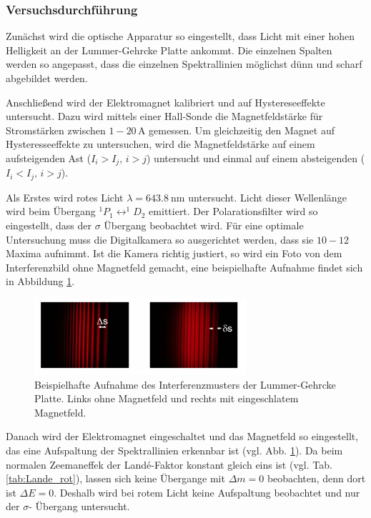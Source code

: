 \subsubsection{Versuchsdurchführung}
Zunächst wird die optische Apparatur so eingestellt, dass Licht mit einer hohen Helligkeit %
an der Lummer-Gehrcke Platte ankommt. Die einzelnen Spalten werden so angepasst, dass die %
einzelnen Spektrallinien möglichst dünn und scharf abgebildet werden.

Anschließend wird der Elektromagnet kalibriert und auf Hystereseeffekte untersucht.
Dazu wird mittels einer Hall-Sonde die Magnetfeldstärke für Stromstärken
zwischen $\num{1}-\num{20}\,\si{\ampere}$ gemessen. Um gleichzeitig den Magnet auf Hysteresseeffekte zu untersuchen,
wird die Magnetfeldstärke auf einem aufsteigenden Ast ($I_i>I_j,\, i>j$) untersucht und einmal auf einem absteigenden ($I_i<I_j,\, i>j$).

Als Erstes wird rotes Licht $\lambda = \SI{643.8}{\nano\meter}$ untersucht.
Licht dieser Wellenlänge wird beim Übergang $^1P_1\leftrightarrow ^1\!\!D_2$ emittiert.
Der Polarationsfilter wird so eingestellt, dass der $\sigma$ Übergang beobachtet wird.
Für eine optimale Untersuchung muss die Digitalkamera so ausgerichtet werden, dass sie $10-12$ Maxima aufnimmt.
Ist die Kamera richtig justiert, so wird ein Foto von dem Interferenzbild ohne Magnetfeld gemacht, eine beispielhafte Aufnahme
findet sich in Abbildung \ref{fig: bsp_foto}.
\FloatBarrier
\begin{figure}[h]
  \centering
  \includegraphics[width=0.7\textwidth]{pics/bsp_foto.png}
  \caption{Beispielhafte Aufnahme des Interferenzmusters der Lummer-Gehrcke Platte. %
  Links ohne Magnetfeld und rechts mit eingeschlatem Magnetfeld\cite{anleitung27}.}
  \label{fig: bsp_foto}
\end{figure}
\FloatBarrier
Danach wird der Elektromagnet eingeschaltet und das Magnetfeld so eingestellt, das eine Aufspaltung der
Spektrallinien erkennbar ist (vgl. Abb. \ref{fig: bsp_foto}). Da beim normalen Zeemaneffek
der Landé-Faktor konstant gleich eins ist (vgl. Tab. \ref{tab:Lande_rot}), lassen sich keine %
Übergange mit $\Delta m=0$ beobachten, denn dort ist $\Delta E=0$. Deshalb wird bei rotem Licht keine Aufspaltung
beobachtet und nur der $\sigma$- Übergang untersucht.  %


